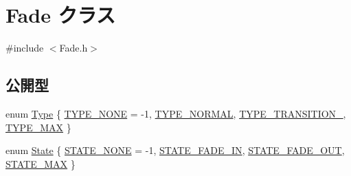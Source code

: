\hypertarget{class_fade}{}\section{Fade クラス}
\label{class_fade}


{\ttfamily \#include $<$Fade.\+h$>$}

\subsection*{公開型}
\begin{DoxyCompactItemize}
\item 
enum \mbox{\hyperlink{class_fade_ac06f27215b454aa05b93c236476d6e80}{Type}} \{ \mbox{\hyperlink{class_fade_ac06f27215b454aa05b93c236476d6e80aff416f0a20b074a38a4f67e20f001828}{T\+Y\+P\+E\+\_\+\+N\+O\+NE}} = -\/1, 
\mbox{\hyperlink{class_fade_ac06f27215b454aa05b93c236476d6e80a6058f5db637853756ba18166da96043e}{T\+Y\+P\+E\+\_\+\+N\+O\+R\+M\+AL}}, 
\mbox{\hyperlink{class_fade_ac06f27215b454aa05b93c236476d6e80af424897abd4b53f7af0bf51f1190a427}{T\+Y\+P\+E\+\_\+\+T\+R\+A\+N\+S\+I\+T\+I\+O\+N\+\_}}, 
\mbox{\hyperlink{class_fade_ac06f27215b454aa05b93c236476d6e80ab05e3987a6b16a8ebe7e284aa8922ea0}{T\+Y\+P\+E\+\_\+\+M\+AX}}
 \}
\item 
enum \mbox{\hyperlink{class_fade_ae77826bf3ff2ab95fb7b3b6f95cba80a}{State}} \{ \mbox{\hyperlink{class_fade_ae77826bf3ff2ab95fb7b3b6f95cba80aae593109007af793c6b0e7e287dcc7803}{S\+T\+A\+T\+E\+\_\+\+N\+O\+NE}} = -\/1, 
\mbox{\hyperlink{class_fade_ae77826bf3ff2ab95fb7b3b6f95cba80aa5b9862985db043392d465dd7a7a7805b}{S\+T\+A\+T\+E\+\_\+\+F\+A\+D\+E\+\_\+\+IN}}, 
\mbox{\hyperlink{class_fade_ae77826bf3ff2ab95fb7b3b6f95cba80aa41e3fdc3eb47279527440d923fccbb6e}{S\+T\+A\+T\+E\+\_\+\+F\+A\+D\+E\+\_\+\+O\+UT}}, 
\mbox{\hyperlink{class_fade_ae77826bf3ff2ab95fb7b3b6f95cba80aab65dcff35c00997ef90c43d254906121}{S\+T\+A\+T\+E\+\_\+\+M\+AX}}
 \}
\end{DoxyCompactItemize}
